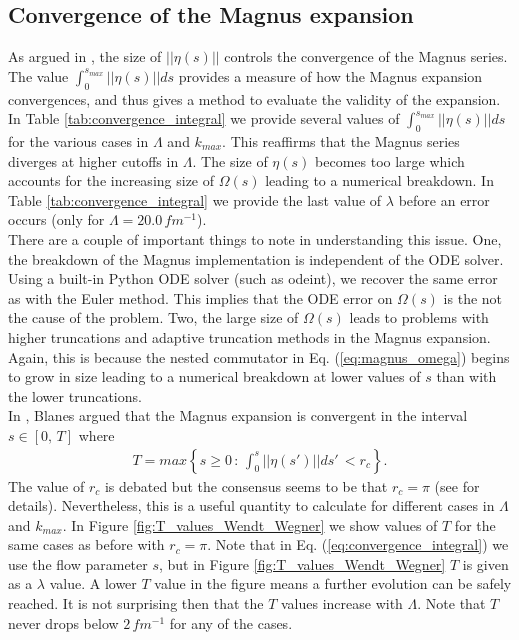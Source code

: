 \documentclass[preprintnumbers,floatfix,aps,prc,preprint]{revtex4-1}
\begin{document}
\newpage

\subsection{Convergence of the Magnus expansion}

As argued in \cite{Blanes:2009}, the size of $||\eta(s)||$ controls the convergence of the Magnus series. The value $\int_{0}^{s_{max}} ||\eta(s)|| ds$ provides a measure of how the Magnus expansion convergences, and thus gives a method to evaluate the validity of the expansion. In Table \ref{tab:convergence_integral} we provide several values of $\int_{0}^{s_{max}} ||\eta(s)|| ds$ for the various cases in $\Lambda$ and $k_{max}$. This reaffirms that the Magnus series diverges at higher cutoffs in $\Lambda$. The size of $\eta(s)$ becomes too large which accounts for the increasing size of $\Omega(s)$ leading to a numerical breakdown. In Table \ref{tab:convergence_integral} we provide the last value of $\lambda$ before an error occurs (only for $\Lambda = 20.0 \, fm^{-1}$). \\

There are a couple of important things to note in understanding this issue. One, the breakdown of the Magnus implementation is independent of the ODE solver. Using a built-in Python ODE solver (such as odeint), we recover the same error as with the Euler method. This implies that the ODE error on $\Omega(s)$ is the not the cause of the problem. Two, the large size of $\Omega(s)$ leads to problems with higher truncations and adaptive truncation methods in the Magnus expansion. Again, this is because the nested commutator in Eq. (\ref{eq:magnus_omega}) begins to grow in size leading to a numerical breakdown at lower values of $s$ than with the lower truncations. \\

In \cite{Blanes:2009}, Blanes argued that the Magnus expansion is convergent in the interval $s \in [0, \, T]$ where
%
\begin{eqnarray}
\label{eq:convergence_integral}
T = max \left \{ s \geq 0 \, : \, \int_{0}^{s} ||\eta(s')|| ds' \, < r_c \right \}.
\end{eqnarray}
%
The value of $r_c$ is debated but the consensus seems to be that $r_c = \pi$ (see \cite{Blanes:2009} for details). Nevertheless, this is a useful quantity to calculate for different cases in $\Lambda$ and $k_{max}$. In Figure \ref{fig:T_values_Wendt_Wegner} we show values of $T$ for the same cases as before with $r_c = \pi$. Note that in Eq. (\ref{eq:convergence_integral}) we use the flow parameter $s$, but in Figure \ref{fig:T_values_Wendt_Wegner} $T$ is given as a $\lambda$ value. A lower $T$ value in the figure means a further evolution can be safely reached. It is not surprising then that the $T$ values increase with $\Lambda$. Note that $T$ never drops below $2 \, fm^{-1}$ for any of the cases.
\end{document}
